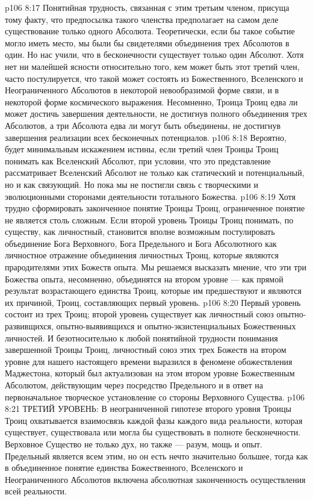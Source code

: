 \vs p106 8:17 Понятийная трудность, связанная с этим третьим членом, присуща тому факту, что предпосылка такого членства предполагает на самом деле существование только одного Абсолюта. Теоретически, если бы такое событие могло иметь место, мы были бы свидетелями  объединения трех Абсолютов в один. Но нас учили, что в бесконечности  существует только один Абсолют. Хотя нет ни малейшей ясности относительно того, кем может быть этот третий член, часто постулируется, что такой может состоять из Божественного, Вселенского и Неограниченного Абсолютов в некоторой невообразимой форме связи, и в некоторой форме космического выражения. Несомненно, Троица Троиц едва ли может достичь завершения деятельности, не достигнув полного объединения трех Абсолютов, а три Абсолюта едва ли могут быть объединены, не достигнув завершения реализации всех бесконечных потенциалов.
\vs p106 8:18 Вероятно, будет минимальным искажением истины, если третий член Троицы Троиц понимать как Вселенский Абсолют, при условии, что это представление рассматривает Вселенский Абсолют не только как статический и потенциальный, но и как связующий. Но пока мы не постигли связь с творческими и эволюционными сторонами деятельности тотального Божества.
\vs p106 8:19 Хотя трудно сформировать законченное понятие Троицы Троиц, ограниченное понятие не является столь сложным. Если второй уровень Троицы Троиц понимать, по существу, как личностный, становится вполне возможным постулировать объединение Бога Верховного, Бога Предельного и Бога Абсолютного как личностное отражение объединения личностных Троиц, которые являются прародителями этих Божеств опыта. Мы решаемся высказать мнение, что эти три Божества опыта, несомненно, объединятся на втором уровне --- как прямой результат возрастающего единства Троиц, которые им предшествуют и являются их причиной, Троиц, составляющих первый уровень.
\vs p106 8:20 Первый уровень состоит из трех Троиц; второй уровень существует как личностный союз опытно\hyp{}развивщихся, опытно\hyp{}выявивщихся и опытно\hyp{}экзистенциальных Божественных личностей. И безотносительно к любой понятийной трудности понимания завершенной Троицы Троиц, личностный союз этих трех Божеств на втором уровне для нашего настоящего времени выразился в феномене обожествления Маджестона, который был актуализован на этом втором уровне Божественным Абсолютом, действующим через посредство Предельного и в ответ на первоначальное творческое установление со стороны Верховного Существа.
\vs p106 8:21 ТРЕТИЙ УРОВЕНЬ: В неограниченной гипотезе второго уровня Троицы Троиц охватывается взаимосвязь каждой фазы каждого вида реальности, которая существует, существовала или могла бы существовать в полноте бесконечности. Верховное Существо не только дух, но также --- разум, мощь и опыт. Предельный является всем этим, но он есть нечто значительно большее, тогда как в объединенное понятие единства Божественного, Вселенского и Неограниченного Абсолютов включена абсолютная законченность осуществления всей реальности.
